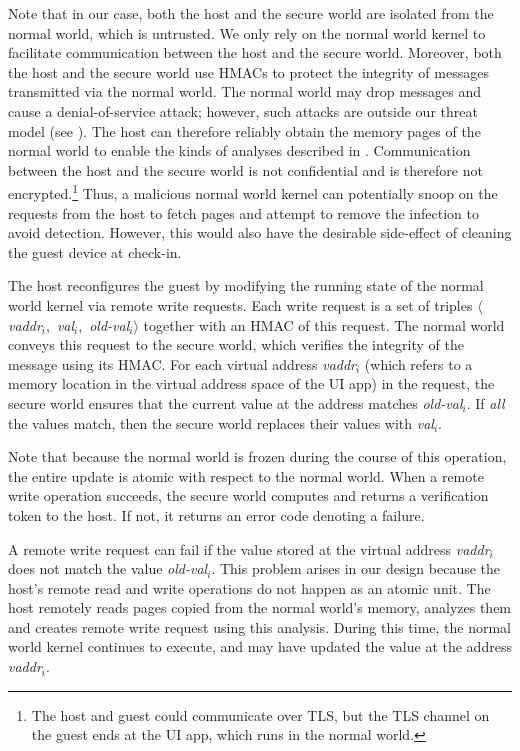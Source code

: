 Note that in our case, both the host and the secure world are isolated from the
normal world, which is untrusted. We only rely on the normal world kernel to
facilitate communication between the host and the secure world. Moreover, both
the host and the secure world use HMACs to protect the integrity of messages
transmitted via the normal world.  The normal world may drop messages and cause
a denial-of-service attack; however, such attacks are outside our threat model
(see ). The host can therefore reliably obtain the
memory pages of the normal world to enable the kinds of analyses described in
. Communication between the host and the
secure world is not confidential and is therefore not encrypted.\footnote{The
host and guest could communicate over TLS, but the TLS channel on the guest
ends at the UI app, which runs in the normal world.} Thus, a malicious normal
world kernel can potentially snoop on the requests from the host to fetch pages
and attempt to remove the infection to avoid detection. However, this would
also have the desirable side-effect of cleaning the guest device at check-in.

%
The host reconfigures the guest by modifying the running state of the normal
world kernel via remote write requests. Each write request is a set of triples
$\langle$\textit{vaddr}$_i$,~\textit{val}$_i$,~\textit{old-val}$_i$$\rangle$
together with an HMAC of this request. The normal world conveys this request to
the secure world, which verifies the integrity of the message using its HMAC.
For each virtual address \textit{vaddr}$_i$ (which refers to a memory location
in the virtual address space of the UI app) in the request, the secure world
ensures that the current value at the address matches \textit{old-val}$_i$. If
\textit{all} the values match, then the secure world replaces their values with
\textit{val}$_i$. 

Note that because the normal world is frozen during the course of this
operation, the entire update is atomic with respect to the normal world. When
a remote write operation succeeds, the secure world computes and returns a
verification token to the host. If not, it returns an error code denoting a
failure.

A remote write request can fail if the value stored at the virtual address
\textit{vaddr}$_i$ does not match the value \textit{old-val}$_i$.  This problem
arises in our design because the host's remote read and write operations do not
happen as an atomic unit. The host remotely reads pages copied from the normal
world's memory, analyzes them and creates remote write request using this
analysis. During this time, the normal world kernel continues to execute, and
may have updated the value at the address \textit{vaddr}$_i$.

